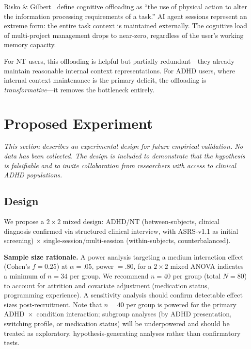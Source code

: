 \documentclass[sigconf,nonacm]{acmart}
\begin{document}
Risko \& Gilbert~\cite{risko2016} define cognitive offloading as ``the use of physical action to alter the information processing requirements of a task.'' AI agent sessions represent an extreme form: the entire task context is maintained externally. The cognitive load of multi-project management drops to near-zero, regardless of the user's working memory capacity.

For NT users, this offloading is helpful but partially redundant---they already maintain reasonable internal context representations. For ADHD users, where internal context maintenance is the primary deficit, the offloading is \emph{transformative}---it removes the bottleneck entirely.

\section{Proposed Experiment}
\label{sec:experiment}

\textit{This section describes an experimental design for future empirical validation. No data has been collected. The design is included to demonstrate that the hypothesis is falsifiable and to invite collaboration from researchers with access to clinical ADHD populations.}

\subsection{Design}

We propose a $2 \times 2$ mixed design: ADHD/NT (between-subjects, clinical diagnosis confirmed via structured clinical interview, with ASRS-v1.1 as initial screening) $\times$ single-session/multi-session (within-subjects, counterbalanced).

\textbf{Sample size rationale.} A power analysis targeting a medium interaction effect (Cohen's $f = 0.25$) at $\alpha = .05$, power $= .80$, for a $2 \times 2$ mixed ANOVA indicates a minimum of $n = 34$ per group. We recommend $n = 40$ per group (total $N = 80$) to account for attrition and covariate adjustment (medication status, programming experience). A sensitivity analysis should confirm detectable effect sizes post-recruitment. Note that $n = 40$ per group is powered for the primary ADHD~$\times$~condition interaction; subgroup analyses (by ADHD presentation, switching profile, or medication status) will be underpowered and should be treated as exploratory, hypothesis-generating analyses rather than confirmatory tests.
\end{document}
